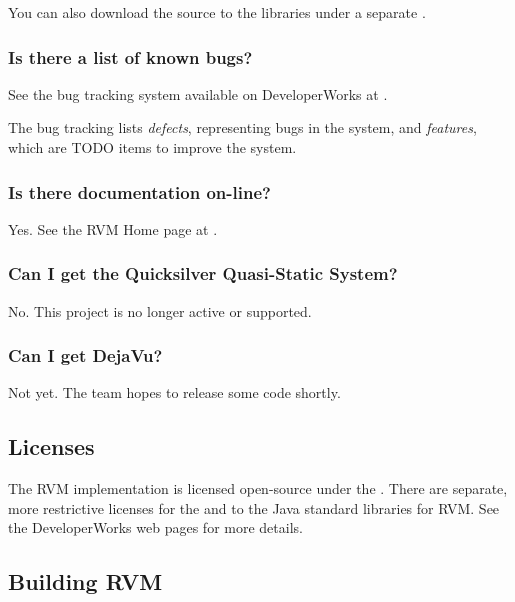 You can also download the source to the libraries under
a separate 
.

\subsubsection{Is there a list of known bugs?}

See the bug tracking system available on DeveloperWorks at 
\xlink{{\tt \RVMBugURL}}{\RVMBugURL}.

The bug tracking lists {\em defects}, representing bugs in the system, and
{\em features}, which are TODO items to improve the system.

\subsubsection{Is there documentation on-line?}

Yes.  See the RVM Home page at
\xlink{{\tt \RVMHomeURL}}{\RVMHomeURL}.


\subsubsection{Can I get the Quicksilver Quasi-Static System?}

No. This project is no longer active or supported.

\subsubsection{Can I get DejaVu?}

Not yet.  The  team hopes to release some code shortly.

\subsection{Licenses}

The RVM implementation is licensed open-source under the 
. 
There are separate, more restrictive licenses 
for the 
 and 
to the Java standard libraries for RVM.  See the DeveloperWorks
web pages for more details. 

\subsection{Building RVM}

